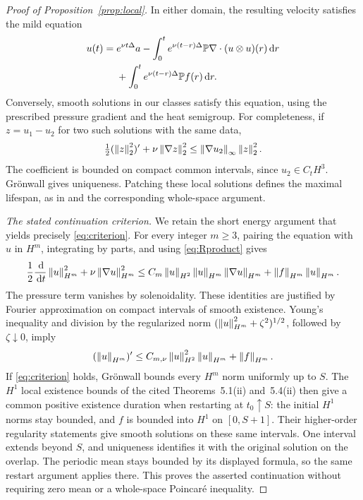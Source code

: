 \begin{proof}[Proof of Proposition~\ref{prop:local}]
In either domain, the resulting velocity satisfies the mild equation
\begin{align}
 u(t)={}&e^{\nu t\Delta}a
 -\int_0^t e^{\nu(t-r)\Delta}\mathbb P\nabla\cdot(u\otimes u)(r)\,\mathrm d r\nonumber\\
 &+\int_0^t e^{\nu(t-r)\Delta}\mathbb P f(r)\,\mathrm d r.\label{eq:mild}
\end{align}
Conversely, smooth solutions in our classes satisfy this equation,
using the prescribed pressure gradient and the heat semigroup. For
completeness, if $z=u_1-u_2$ for two such solutions with the same data,
\[
 \tfrac12(\left\lVert z\right\rVert_2^2)'+\nu\left\lVert\nabla z\right\rVert_2^2
 \le\left\lVert\nabla u_2\right\rVert_\infty\left\lVert z\right\rVert_2^2.
\]
The coefficient is bounded on compact common intervals, since
$u_2\in C_tH^3$. Gr\"onwall gives uniqueness. Patching these local
solutions defines the maximal lifespan, as in
\cite[Corollary~5.2]{tao2013} and the corresponding whole-space argument.

\emph{The stated continuation criterion.}
We retain the short energy argument that yields precisely
\eqref{eq:criterion}. For every integer $m\ge3$, pairing the equation
with $u$ in $H^m$, integrating by parts, and using
\eqref{eq:Rproduct} gives
\begin{equation}\label{eq:Rhigh}
 \frac12\frac{\,\mathrm d}{\,\mathrm d t}\left\lVert u\right\rVert_{H^m}^2
 +\nu\left\lVert\nabla u\right\rVert_{H^m}^2
 \le C_m\left\lVert u\right\rVert_{H^2}\left\lVert u\right\rVert_{H^m}\left\lVert\nabla u\right\rVert_{H^m}
      +\left\lVert f\right\rVert_{H^m}\left\lVert u\right\rVert_{H^m}.
\end{equation}
The pressure term vanishes by solenoidality. These identities are
justified by Fourier approximation on compact intervals of smooth
existence. Young's inequality and division by the regularized norm
$(\left\lVert u\right\rVert_{H^m}^2+\zeta^2)^{1/2}$, followed by $\zeta\downarrow0$, imply
\begin{equation}\label{eq:highcontinuation}
 (\left\lVert u\right\rVert_{H^m})'
 \le C_{m,\nu}\left\lVert u\right\rVert_{H^2}^2\left\lVert u\right\rVert_{H^m}+\left\lVert f\right\rVert_{H^m}.
\end{equation}
If \eqref{eq:criterion} holds, Gr\"onwall bounds every $H^m$ norm
uniformly up to $S$. The $H^1$ local existence bounds of the cited
Theorems~5.1(ii) and~5.4(ii) then give a common positive existence
duration when restarting at $t_0\uparrow S$: the initial $H^1$ norms
stay bounded, and $f$ is bounded into $H^1$ on $[0,S+1]$.
Their higher-order regularity statements give smooth solutions on
these same intervals. One interval extends beyond $S$, and uniqueness
identifies it with the original solution on the overlap. The periodic
mean stays bounded by its displayed formula, so the same restart
argument applies there. This proves the asserted continuation without
requiring zero mean or a whole-space Poincar\'e inequality.
\end{proof}
